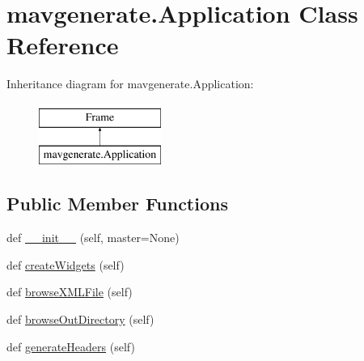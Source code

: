 \hypertarget{classmavgenerate_1_1Application}{}\section{mavgenerate.\+Application Class Reference}
\label{classmavgenerate_1_1Application}
Inheritance diagram for mavgenerate.\+Application\+:\begin{figure}[H]
\begin{center}
\leavevmode
\includegraphics[height=2.000000cm]{classmavgenerate_1_1Application}
\end{center}
\end{figure}
\subsection*{Public Member Functions}
\begin{DoxyCompactItemize}
\item 
def \mbox{\hyperlink{classmavgenerate_1_1Application_a102f9945e9b6e87946ac389c83c54bc1}{\+\_\+\+\_\+init\+\_\+\+\_\+}} (self, master=None)
\item 
def \mbox{\hyperlink{classmavgenerate_1_1Application_a87a3527491a19cc5815364afe2ff96e5}{create\+Widgets}} (self)
\item 
def \mbox{\hyperlink{classmavgenerate_1_1Application_a709e2711f42d143e1fe4184437c99fa7}{browse\+X\+M\+L\+File}} (self)
\item 
def \mbox{\hyperlink{classmavgenerate_1_1Application_a51a50e0ae663d975e2106600310825fb}{browse\+Out\+Directory}} (self)
\item 
def \mbox{\hyperlink{classmavgenerate_1_1Application_a1643cb62a9d7374557f6c04bace5092a}{generate\+Headers}} (self)
\end{DoxyCompactItemize}
